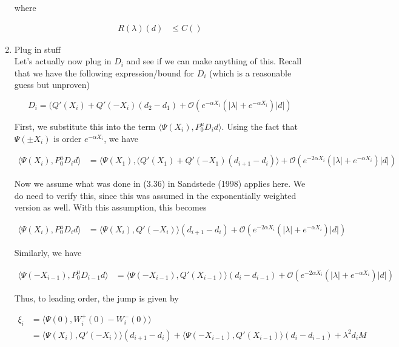 \documentclass[12pt]{article}
\begin{document}
\begin{enumerate}
where

\begin{align*}
R(\lambda)(d) &\leq C()
\end{align*}

\item Plug in stuff \\

Let's actually now plug in $D_i$ and see if we can make anything of this. Recall that we have the following expression/bound for $D_i$ (which is a reasonable guess but unproven)

\[
D_i = ( Q'(X_i) + Q'(-X_i)(d_2 - d_1) + \mathcal{O} \left( e^{-\alpha X_i} \left( |\lambda| +  e^{-\alpha X_i}  \right) |d| \right)
\]

First, we substitute this into the term $\langle \Psi(X_i), P^u_0 D_i d \rangle$. Using the fact that $\Psi(\pm X_i)$ is order $e^{-\alpha X_i}$, we have

\begin{align*}
\langle \Psi(X_i), P^u_0 D_i d \rangle &= \langle \Psi(X_1), (Q'(X_1) + Q'(-X_1 )(d_{i+1} - d_i ) \rangle + \mathcal{O} \left( e^{-2 \alpha X_i} \left( |\lambda| +  e^{-\alpha X_i}  \right) |d| \right)
\end{align*}

Now we assume what was done in (3.36) in Sandstede (1998) applies here. We do need to verify this, since this was assumed in the exponentially weighted version as well. With this assumption, this becomes

\begin{align*}
\langle \Psi(X_i), P^u_0 D_i d \rangle &= \langle \Psi(X_i), Q'(-X_i) \rangle (d_{i+1} - d_i ) + \mathcal{O} \left( e^{-2 \alpha X_i} \left( |\lambda| +  e^{-\alpha X_i}  \right) |d| \right)
\end{align*}

Similarly, we have

\begin{align*}
\langle \Psi(-X_{i-1}), P^u_0 D_{i-1} d \rangle &= \langle \Psi(-X_{i-1}), Q'(X_{i-1}) \rangle (d_i - d_{i-1} ) + \mathcal{O} \left( e^{-2 \alpha X_i} \left( |\lambda| +  e^{-\alpha X_i}  \right) |d| \right)
\end{align*}

Thus, to leading order, the jump is given by

\begin{align*}
\xi_i &= \langle \Psi(0), W_i^+(0) - W_i^-(0) \rangle \\
&= \langle \Psi(X_i), Q'(-X_i) \rangle (d_{i+1} - d_i ) + \langle \Psi(-X_{i-1}), Q'(X_{i-1}) \rangle (d_i - d_{i-1} ) + \lambda^2 d_i M
\end{align*}


\end{enumerate}
\end{document}
